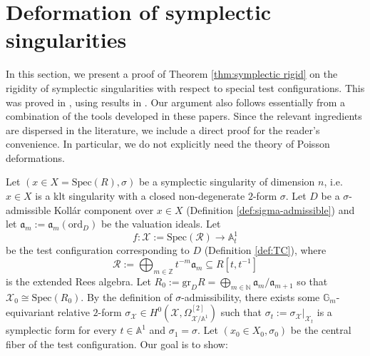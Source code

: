 \documentclass[12pt]{amsart}
\theoremstyle{definition}
\newtheorem{expl}[prop]{Example}
\newcommand{\bA}{\mathbb{A}}
\newcommand{\bZ}{\mathbb{Z}}
\newcommand{\bN}{\mathbb{N}}
\newcommand{\bG}{\mathbb{G}}
\newcommand{\cR}{\mathcal{R}}
\newcommand{\scX}{\mathscr{X}}
\newcommand{\fa}{\mathfrak{a}}
\newcommand{\rd}{\mathrm{d}}
\newcommand{\Spec}{\mathrm{Spec}}
\newcommand{\ord}{\mathrm{ord}}
\newcommand{\gr}{\mathrm{gr}}
\numberwithin{equation}{section}
\begin{document}





\section{Deformation of symplectic singularities}\label{s-deformation}

In this section, we present a proof of Theorem \ref{thm:symplectic rigid} on the rigidity of symplectic singularities with respect to special test configurations. This was proved in \cite{NO-symp}, using results in \cite{Namikawa-deformation-terminal,Namikawa-deformation,Namikawa-notes-on-deformation}.
Our argument also follows essentially from a combination of the tools developed in these papers. Since the relevant
ingredients are dispersed in the literature, we include a direct proof for
the reader's convenience. In particular, we do not explicitly need the theory of Poisson deformations.


Let $(x\in X=\Spec(R),\sigma)$ be a symplectic singularity of dimension $n$, i.e. $x\in X$ is a klt singularity with a closed non-degenerate $2$-form $\sigma$. Let $D$ be a $\sigma$-admissible Koll\'ar component over $x\in X$ (Definition \ref{def:sigma-admissible}) and let $\fa_m:=\fa_m(\ord_D)$ be the valuation ideals. Let
\[
f\colon \scX:=\Spec(\cR)\to \bA^1_t
\]
be the test configuration corresponding to $D$ (Definition \ref{def:TC}), where
\begin{equation} \label{eq:extended Rees repeated}
\cR:=\bigoplus_{m\in\bZ} t^{-m} \fa_m \subseteq R[t,t^{-1}]
\end{equation} 
is the extended Rees algebra. Let $R_0:=\gr_D R = \bigoplus_{m\in\bN} \fa_m/\fa_{m+1}$ so that $\scX_0\cong \Spec(R_0)$. By the definition of $\sigma$-admissibility, there exists some $\bG_m$-equivariant relative $2$-form $\sigma_{\scX}\in H^0(\scX,\Omega^{[2]}_{\scX/\bA^1})$ such that $\sigma_t:=\sigma_{\scX}|_{\scX_t}$ is a symplectic form for every $t\in \bA^1$ and $\sigma_1=\sigma$. Let $(x_0\in X_0,\sigma_0)$ be the central fiber of the test configuration. Our goal is to show:
\end{document}
